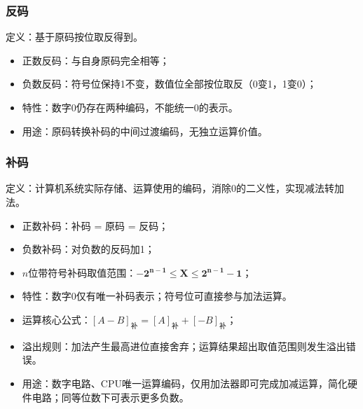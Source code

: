 \subsubsection{反码}
定义：基于原码按位取反得到。
\begin{itemize}
    \item 正数反码：与自身原码完全相等；
    \item 负数反码：符号位保持1不变，数值位全部按位取反（0变1，1变0）；
    \item 特性：数字0仍存在两种编码，不能统一0的表示。
    \item 用途：原码转换补码的中间过渡编码，无独立运算价值。
\end{itemize}

\subsubsection{补码}
定义：计算机系统实际存储、运算使用的编码，消除0的二义性，实现减法转加法。
\begin{itemize}
    \item 正数补码：补码 = 原码 = 反码；
    \item 负数补码：对负数的反码加1；
    \item $n$位带符号补码取值范围：$\boldsymbol{-2^{n-1} \le X \le 2^{n-1}-1}$；
    \item 特性：数字0仅有唯一补码表示；符号位可直接参与加法运算。
    \item 运算核心公式：$[A-B]_{\text{补}} = [A]_{\text{补}} + [-B]_{\text{补}}$；
    \item 溢出规则：加法产生最高进位直接舍弃；运算结果超出取值范围则发生溢出错误。
    \item 用途：数字电路、CPU唯一运算编码，仅用加法器即可完成加减运算，简化硬件电路；同等位数下可表示更多负数。
\end{itemize}

